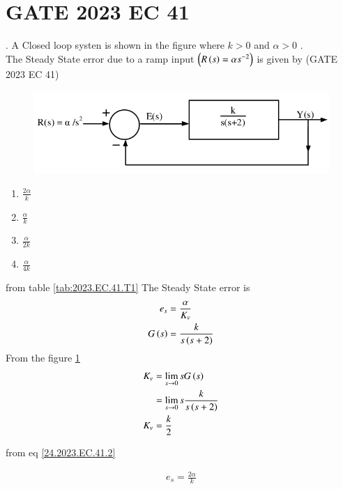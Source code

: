 \documentclass[journal,12pt,twocolumn]{IEEEtran}
\begin{document}


\vspace{3cm}

\title{}
\author{EE23BTECH11024 - G.Karthik Yadav$^{*}$
}
\maketitle
\newpage
\bigskip

\section*{GATE 2023 EC 41}
. \hspace{2pt} A Closed loop systen is shown in the figure where $k>0$ and $\alpha>0$ .\\
The Steady State error due to a ramp input $\left(R\left(s\right) = \alpha s^{-2}\right)$ is given by \hfill{(GATE 2023 EC 41)}

\begin{figure}[ht]
\centering
    \includegraphics[width=1.2\linewidth]{figs/question.png}
    \label{fig: 23.EC.41.24}
\end{figure}

\begin{enumerate}
\item $\frac{2\alpha}{k}$
\item $\frac{\alpha}{k}$
\item $\frac{\alpha}{2k}$
\item $\frac{\alpha}{4k}$
\end{enumerate}

\solution


from table \ref{tab:2023.EC.41.T1}
The Steady State error is\\
\begin{align}
	e_s &= \frac{\alpha}{K_v} \label{24.2023.EC.41.2} \\
 G\left(s\right) &= \frac{k}{s\left(s+2\right)} 
\end{align}
From the figure \ref{fig: 23.EC.41.24}\\
\begin{align}
        K_v &= \displaystyle\lim_{s\to 0}s G\left(s\right)\\
	 &= \displaystyle\lim_{s\to 0}s \frac{k}{s\left(s+2\right)} \\
	 K_v &= \frac{k}{2}
\end{align}

from eq \eqref{24.2023.EC.41.2} 

\begin{align}
	e_s = \frac{2\alpha}{k}
\end{align}
\end{document}
